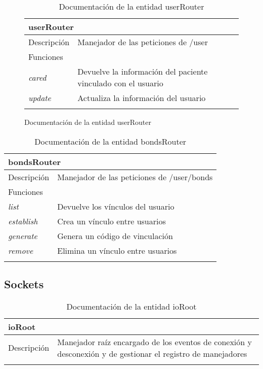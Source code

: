 \begin{figure}[H]
\begin{longtable}{|p{} p{}|}
    \hline
    \multicolumn{2}{|l|}{\textbf{userRouter}} \\ \hline \hline
    Descripción      & Manejador de las peticiones de /user \\ \hline
    \multicolumn{2}{|l|}{Funciones} \\
    \emph{cared}  & Devuelve la información del paciente vinculado con el usuario  \\
    \emph{update}  & Actualiza la información del usuario  \\  \hline
    \caption{Documentación de la entidad userRouter}
    \label{dis:api:user_router}
\end{longtable}
\end{figure}

\begin{longtable}{|p{} p{}|}
    \hline
    \multicolumn{2}{|l|}{\textbf{bondsRouter}} \\ \hline \hline
    Descripción      & Manejador de las peticiones de /user/bonds \\ \hline
    \multicolumn{2}{|l|}{Funciones} \\
    \emph{list}  & Devuelve los vínculos del usuario  \\
    \emph{establish}  & Crea un vínculo entre usuarios  \\
    \emph{generate}  & Genera un código de vinculación  \\
    \emph{remove} & Elimina un vínculo entre usuarios \\ \hline
    \caption{Documentación de la entidad bondsRouter}
    \label{dis:api:bonds_router}
\end{longtable}

\subsection{Sockets}

\begin{longtable}{|p{} p{}|}
    \hline
    \multicolumn{2}{|l|}{\textbf{ioRoot}} \\ \hline \hline
    Descripción      & Manejador raíz encargado de los eventos de conexión y desconexión y de gestionar el registro de manejadores \\ \hline
    \caption{Documentación de la entidad ioRoot}
    \label{dis:api:io_root}
\end{longtable}

